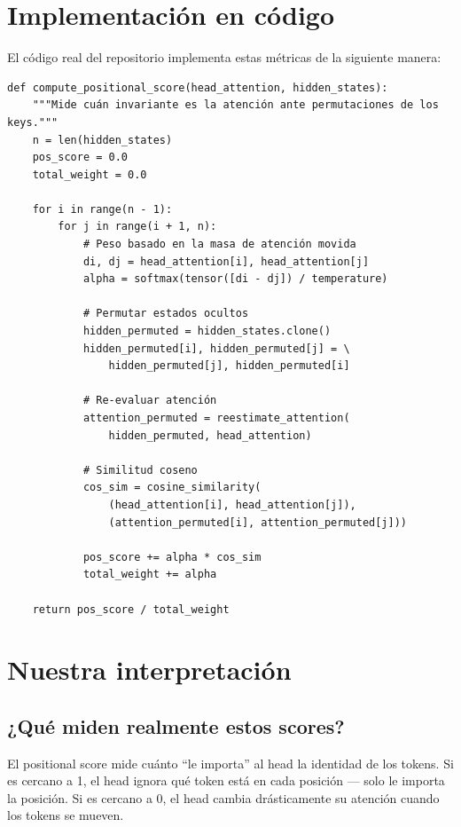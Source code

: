 \documentclass[12pt,a4paper,oneside]{report}
\begin{document}
\section{Implementación en código}

El código real del repositorio implementa estas métricas de la siguiente manera:

\begin{lstlisting}
def compute_positional_score(head_attention, hidden_states):
    """Mide cuán invariante es la atención ante permutaciones de los keys."""
    n = len(hidden_states)
    pos_score = 0.0
    total_weight = 0.0

    for i in range(n - 1):
        for j in range(i + 1, n):
            # Peso basado en la masa de atención movida
            di, dj = head_attention[i], head_attention[j]
            alpha = softmax(tensor([di - dj]) / temperature)

            # Permutar estados ocultos
            hidden_permuted = hidden_states.clone()
            hidden_permuted[i], hidden_permuted[j] = \
                hidden_permuted[j], hidden_permuted[i]

            # Re-evaluar atención
            attention_permuted = reestimate_attention(
                hidden_permuted, head_attention)

            # Similitud coseno
            cos_sim = cosine_similarity(
                (head_attention[i], head_attention[j]),
                (attention_permuted[i], attention_permuted[j]))

            pos_score += alpha * cos_sim
            total_weight += alpha

    return pos_score / total_weight
\end{lstlisting}

\section{Nuestra interpretación}

\subsection{¿Qué miden realmente estos scores?}

El positional score mide cuánto ``le importa'' al head la identidad de los tokens. Si es cercano a 1, el head ignora qué token está en cada posición — solo le importa la posición. Si es cercano a 0, el head cambia drásticamente su atención cuando los tokens se mueven.
\end{document}
